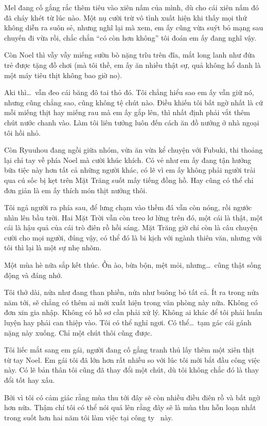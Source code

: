 \documentclass[../main.tex]{subfiles}
\begin{document}
Mel đang cố gắng rắc thêm tiêu vào xiên nấm của mình, dù cho cái xiên nấm đó đã cháy khét từ lúc nào. Một nụ cười trừ vô tình xuất hiện khi thấy mọi thứ không diễn ra suôn sẻ, nhưng nghĩ lại mà xem, em ấy cũng vừa suýt bỏ mạng sau chuyến đi vừa rồi, chắc chắn ``có còn hơn không'' tôi đoán em ấy đang nghĩ vậy.

Còn Noel thì vẫy vẫy miếng sườn bò nặng trĩu trên đĩa, mắt long lanh như đứa trẻ được tặng đồ chơi (mà tôi thề, em ấy ăn nhiều thật sự, quả không hổ danh là một máy tiêu thịt không bao giờ no).

Aki thì\dots\ vẫn đeo cái băng đô tai thỏ đó. Tôi chẳng hiểu sao em ấy vẫn giữ nó, nhưng cũng chẳng sao, cũng không tệ chút nào. Điều khiến tôi bất ngờ nhất là cứ mỗi miếng thịt hay miếng rau mà em ấy gắp lên, thì nhất định phải vắt thêm chút nước chanh vào. Làm tôi liên tưởng luôn đến cách ăn đồ nướng ở nhà ngoại tôi hồi nhỏ.

Còn Ryuuhou đang ngồi giữa nhóm, vừa ăn vừa kể chuyện với Fubuki, thi thoảng lại chỉ tay về phía Noel mà cười khúc khích. Có vẻ như em ấy đang tận hưởng bữa tiệc này hơn tất cả những người khác, có lẽ vì em ấy không phải người trải qua cú sốc bị kẹt trên Mặt Trăng suốt mấy tiếng đồng hồ. Hay cũng có thể chỉ đơn giản là em ấy thích món thịt nướng thôi.

Tôi ngả người ra phía sau, để lưng chạm vào thềm đá vẫn còn nóng, rồi ngước nhìn lên bầu trời. Hai Mặt Trời vẫn còn treo lơ lửng trên đó, một cái là thật, một cái là hậu quả của cái trò điên rồ hồi sáng. Mặt Trăng giờ chỉ còn là câu chuyện cười cho mọi người, đúng vậy, có thể đó là bi kịch với ngành thiên văn, nhưng với tôi thì lại là một sự nhẹ nhõm.

Một mùa hè nữa sắp kết thúc. Ồn ào, bừa bộn, mệt mỏi, nhưng\dots\ cũng thật sống động và đáng nhớ.

Tôi thở dài, nửa như đang than phiền, nửa như buông bỏ tất cả. Ít ra trong nửa năm tới, sẽ chẳng có thêm ai mới xuất hiện trong văn phòng này nữa. Không có đơn xin gia nhập. Không có hồ sơ cần phải xử lý. Không ai khác để tôi phải huấn luyện hay phải can thiệp vào. Tôi có thể nghỉ ngơi. Có thể\dots\ tạm gác cái gánh nặng này xuống. Chỉ một chút thôi cũng được.

Tôi liếc mắt sang em gái, người đang cố gắng tranh thủ lấy thêm một xiên thịt từ tay Noel. Em gái tôi đã lớn hơn rất nhiều so với lúc tôi mới bắt đầu công việc này. Có lẽ bản thân tôi cũng đã thay đổi một chút, dù tôi không chắc đó là thay đổi tốt hay xấu.

Bởi vì tôi có cảm giác rằng mùa thu tới đây sẽ còn nhiều điều điên rồ và bất ngờ hơn nữa. Thậm chí tôi có thể nói quá lên rằng đây sẽ là mùa thu hỗn loạn nhất trong suốt hơn hai năm tôi làm việc tại công ty \hll\ này.
\end{document}
